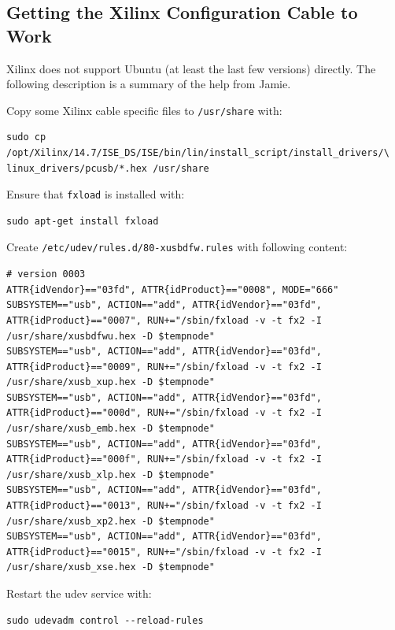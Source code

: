 \documentclass[a4paper,fontsize=10pt,twoside,DIV15,BCOR12mm,headinclude=true,footinclude=false,pagesize,bibtotoc]{scrbook}
\newcommand{\code}[1]{{\texttt{#1}}}
\begin{document}
\subsection{Getting the Xilinx Configuration Cable to Work}

Xilinx does not support Ubuntu (at least the last few versions) directly. The following description
is a summary of the help from Jamie.

Copy some Xilinx cable specific files to \code{/usr/share} with:

\begin{verbatim}
sudo cp /opt/Xilinx/14.7/ISE_DS/ISE/bin/lin/install_script/install_drivers/\
linux_drivers/pcusb/*.hex /usr/share
\end{verbatim}
 
Ensure that \code{fxload} is installed with:
\begin{verbatim} 
sudo apt-get install fxload
\end{verbatim}

Create \code{/etc/udev/rules.d/80-xusbdfw.rules} with following content:

\begin{tiny}
\begin{verbatim}
# version 0003
ATTR{idVendor}=="03fd", ATTR{idProduct}=="0008", MODE="666"
SUBSYSTEM=="usb", ACTION=="add", ATTR{idVendor}=="03fd", ATTR{idProduct}=="0007", RUN+="/sbin/fxload -v -t fx2 -I /usr/share/xusbdfwu.hex -D $tempnode"
SUBSYSTEM=="usb", ACTION=="add", ATTR{idVendor}=="03fd", ATTR{idProduct}=="0009", RUN+="/sbin/fxload -v -t fx2 -I /usr/share/xusb_xup.hex -D $tempnode"
SUBSYSTEM=="usb", ACTION=="add", ATTR{idVendor}=="03fd", ATTR{idProduct}=="000d", RUN+="/sbin/fxload -v -t fx2 -I /usr/share/xusb_emb.hex -D $tempnode"
SUBSYSTEM=="usb", ACTION=="add", ATTR{idVendor}=="03fd", ATTR{idProduct}=="000f", RUN+="/sbin/fxload -v -t fx2 -I /usr/share/xusb_xlp.hex -D $tempnode"
SUBSYSTEM=="usb", ACTION=="add", ATTR{idVendor}=="03fd", ATTR{idProduct}=="0013", RUN+="/sbin/fxload -v -t fx2 -I /usr/share/xusb_xp2.hex -D $tempnode"
SUBSYSTEM=="usb", ACTION=="add", ATTR{idVendor}=="03fd", ATTR{idProduct}=="0015", RUN+="/sbin/fxload -v -t fx2 -I /usr/share/xusb_xse.hex -D $tempnode"
\end{verbatim}
\end{tiny}

Restart the udev service with:

\begin{verbatim} 
sudo udevadm control --reload-rules
\end{verbatim}
\end{document}
